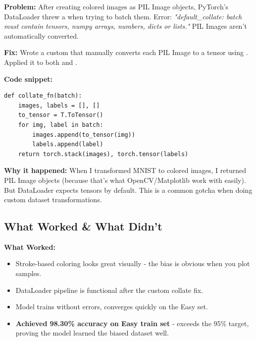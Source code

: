 \documentclass[9pt,a4paper,twocolumn,twoside]{tau-class/tau}
\begin{document}
        \begin{tauenv}[frametitle=Issue: PIL Image to Tensor Conversion in DataLoader]
            \textbf{Problem:} After creating colored images as PIL Image objects, PyTorch's DataLoader threw a  when trying to batch them. Error: \textit{"default\_collate: batch must contain tensors, numpy arrays, numbers, dicts or lists."} PIL Images aren't automatically converted.
            
            \textbf{Fix:} Wrote a custom  that manually converts each PIL Image to a tensor using . Applied it to both  and .
            
            \textbf{Code snippet:}
            \begin{verbatim}
def collate_fn(batch):
    images, labels = [], []
    to_tensor = T.ToTensor()
    for img, label in batch:
        images.append(to_tensor(img))
        labels.append(label)
    return torch.stack(images), torch.tensor(labels)
            \end{verbatim}
            
            \textbf{Why it happened:} When I transformed MNIST to colored images, I returned PIL Image objects (because that's what OpenCV/Matplotlib work with easily). But DataLoader expects tensors by default. This is a common gotcha when doing custom dataset transformations.
        \end{tauenv}
        
    \subsection{What Worked \& What Didn't}
    
        \textbf{What Worked:}
        \begin{itemize}
            \item Stroke-based coloring looks great visually - the bias is obvious when you plot samples.
            \item DataLoader pipeline is functional after the custom collate fix.
            \item Model trains without errors, converges quickly on the Easy set.
            \item \textbf{Achieved 98.30\% accuracy on Easy train set} - exceeds the 95\% target, proving the model learned the biased dataset well.
        \end{itemize}
        
\end{document}
